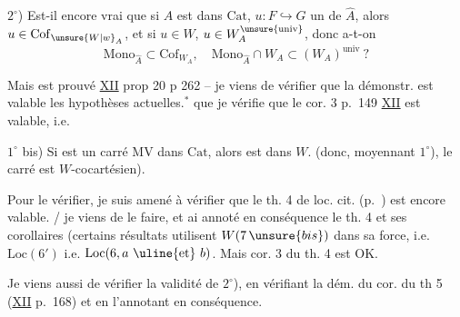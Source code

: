 $2^\circ$) Est-il encore vrai que si $A$ est dans $\mathrm{Cat}$, $u:F\hookrightarrow G$ un  de $\widehat A$, alors $u\in\mathrm{Cof}_{\unsure{W|w}_A}$, et si $u\in W$, $u\in W_A^{\unsure{\mathrm{univ}}}$, donc a-t-on
\[
\mathrm{Mono}_{\widehat A}\subset\mathrm{Cof}_{W_A},\quad
\mathrm{Mono}_{\widehat A}\cap W_A\subset(W_A)^{\mathrm{univ}}\ ?
\]

Mais  est prouvé  \uline{XII} prop 20 p 262 -- je viens de vérifier que la démonstr. est valable  les hypothèses actuelles.$^{\ast}$  que je vérifie que le cor. 3 p.~149 \uline{XII} est valable, i.e.

$1^\circ$ bis) Si
est un carré $\mathrm{MV}$ dans $\mathrm{Cat}$, alors
est dans $W$. (donc, moyennant $1^\circ$), le carré est $W$-cocartésien).

Pour le vérifier, je suis amené à vérifier que le th. 4 de loc. cit. (p.~) est encore valable. / je viens de le faire, et ai annoté en conséquence le th. 4 et ses corollaires (certains résultats  utilisent $W(7\,\unsure{bis})$ dans  sa force, i.e. $\mathrm{Loc}(6')$ i.e. $\mathrm{Loc}(6,a\ \text{\uline{et}}\ b)$. Mais  cor. 3 du th. 4 est OK.

Je viens aussi de vérifier la validité de $2^\circ$), en vérifiant la dém. du cor. du th 5 (\uline{XII} p.~168) et en l'annotant en conséquence.

